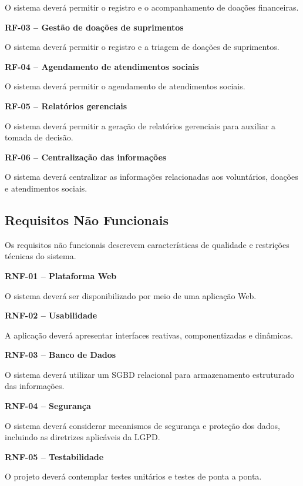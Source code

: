\documentclass[12pt,a4paper]{article}
\begin{document}
O sistema deverá permitir o registro e o acompanhamento de doações
financeiras.

\textbf{RF-03 -- Gestão de doações de suprimentos}

O sistema deverá permitir o registro e a triagem de doações de
suprimentos.

\textbf{RF-04 -- Agendamento de atendimentos sociais}

O sistema deverá permitir o agendamento de atendimentos sociais.

\textbf{RF-05 -- Relatórios gerenciais}

O sistema deverá permitir a geração de relatórios gerenciais para
auxiliar a tomada de decisão.

\textbf{RF-06 -- Centralização das informações}

O sistema deverá centralizar as informações relacionadas aos
voluntários, doações e atendimentos sociais.


\subsection*{Requisitos Não Funcionais}

Os requisitos não funcionais descrevem características de qualidade e
restrições técnicas do sistema.

\textbf{RNF-01 -- Plataforma Web}

O sistema deverá ser disponibilizado por meio de uma aplicação Web.

\textbf{RNF-02 -- Usabilidade}

A aplicação deverá apresentar interfaces reativas, componentizadas e
dinâmicas.

\textbf{RNF-03 -- Banco de Dados}

O sistema deverá utilizar um SGBD relacional para armazenamento
estruturado das informações.

\textbf{RNF-04 -- Segurança}

O sistema deverá considerar mecanismos de segurança e proteção dos
dados, incluindo as diretrizes aplicáveis da LGPD.

\textbf{RNF-05 -- Testabilidade}

O projeto deverá contemplar testes unitários e testes de ponta a ponta.

\end{document}
